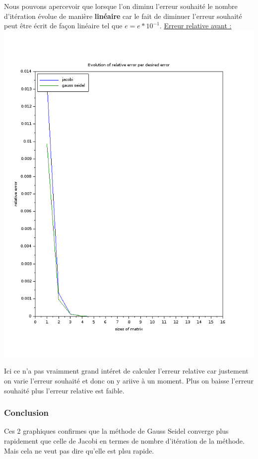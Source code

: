 \documentclass[11pt]{article}
\begin{document}
Nous pouvons apercevoir que lorsque l'on diminu l'erreur souhaité le
nombre d'itération évolue de manière \textbf{linéaire} car le fait de
diminuer l'erreur souhaité peut être écrit de façon linéaire tel que
$e = e * 10^{-1}$.\newline
\vspace{5mm}
\underline{Erreur relative avant :}\newline
\includegraphics[scale=0.5]{img/error_relres.png}

Ici ce n'a pas vraimment grand intéret de calculer l'erreur relative
car justement on varie l'erreur souhaité et donc on y ariive à un
moment. Plus on baisse l'erreur souhaité plus l'erreur relative est faible.

\subsubsection{Conclusion}

Ces 2 graphiques confirmes que la méthode de Gauss Seidel converge
plus rapidement que celle de Jacobi en termes de nombre d'itération de
la méthode. Mais cela ne veut pas dire qu'elle est plsu rapide.
\end{document}
